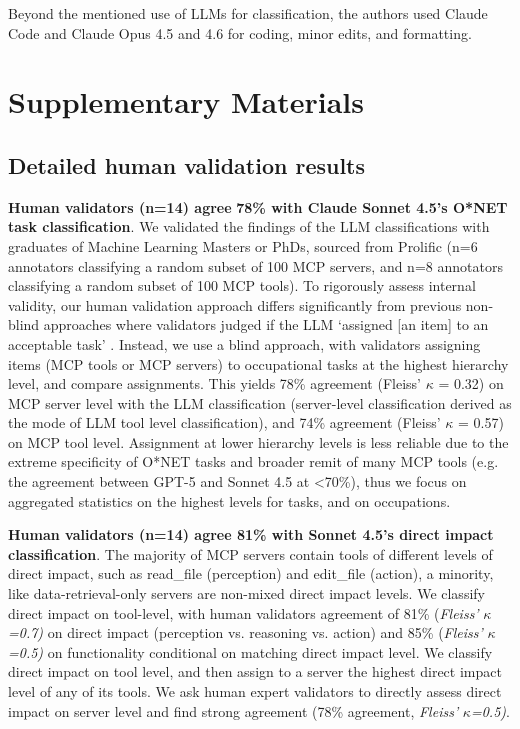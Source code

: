 \documentclass[manuscript,screen,nonacm,oneside]{acmart}
\begin{document}
Beyond the mentioned use of LLMs for classification, the authors used Claude Code and Claude Opus 4.5 and 4.6 for coding, minor edits, and formatting.




\appendix

\section{Supplementary Materials}

\subsection{Detailed human validation results}
\label{app:validation}

\textbf{Human validators (n=14) agree} \textbf{78\% with Claude Sonnet 4.5's O*NET task classification}. We validated the findings of the LLM classifications with graduates of Machine Learning Masters or PhDs, sourced from Prolific (n=6 annotators classifying a random subset of 100 MCP servers, and n=8 annotators classifying a random subset of 100 MCP tools). To rigorously assess internal validity, our human validation approach differs significantly from previous non-blind approaches where validators judged if the LLM `assigned {[}an item{]} to an acceptable task' \citep[see][supplementary materials]{handa2025which}. Instead, we use a blind approach, with validators assigning items (MCP tools or MCP servers) to occupational tasks at the highest hierarchy level, and compare assignments. This yields 78\% agreement (Fleiss' $\kappa$ = 0.32) on MCP server level with the LLM classification (server-level classification derived as the mode of LLM tool level classification), and 74\% agreement (Fleiss' $\kappa$ = 0.57) on MCP tool level. Assignment at lower hierarchy levels is less reliable due to the extreme specificity of O*NET tasks and broader remit of many MCP tools (e.g. the agreement between GPT-5 and Sonnet 4.5 at \textless70\%), thus we focus on aggregated statistics on the highest levels for tasks, and on occupations.

\textbf{Human validators (n=14) agree 81\% with Sonnet 4.5's direct impact classification}. The majority of MCP servers contain tools of different levels of direct impact, such as read\_file (perception) and edit\_file (action), a minority, like data-retrieval-only servers are non-mixed direct impact levels. We classify direct impact on tool-level, with human validators agreement of 81\% (\emph{Fleiss'} \(\kappa\)\emph{=0.7)} on direct impact (perception vs. reasoning vs. action) and 85\% (\emph{Fleiss'} \(\kappa\)\emph{=0.5)} on functionality conditional on matching direct impact level. We classify direct impact on tool level, and then assign to a server the highest direct impact level of any of its tools. We ask human expert validators to directly assess direct impact on server level and find strong agreement (78\% agreement, \emph{Fleiss'} \(\kappa\)\emph{=0.5)}.
\end{document}
